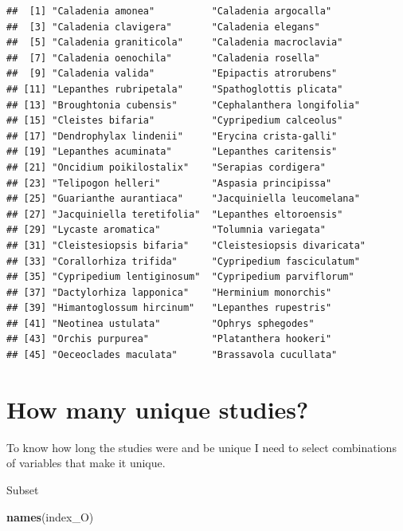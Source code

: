 \documentclass[
]{book}
\newenvironment{Shaded}{\begin{snugshade}}{\end{snugshade}}
\newcommand{\FunctionTok}[1]{\textcolor[rgb]{0.13,0.29,0.53}{\textbf{#1}}}
\newcommand{\NormalTok}[1]{#1}
\newcommand{\SpecialCharTok}[1]{\textcolor[rgb]{0.81,0.36,0.00}{\textbf{#1}}}
\theoremstyle{definition}
\theoremstyle{definition}
\theoremstyle{definition}
\theoremstyle{definition}
\theoremstyle{remark}
\begin{document}
\begin{Shaded}
\end{Shaded}

\begin{verbatim}
##  [1] "Caladenia amonea"          "Caladenia argocalla"      
##  [3] "Caladenia clavigera"       "Caladenia elegans"        
##  [5] "Caladenia graniticola"     "Caladenia macroclavia"    
##  [7] "Caladenia oenochila"       "Caladenia rosella"        
##  [9] "Caladenia valida"          "Epipactis atrorubens"     
## [11] "Lepanthes rubripetala"     "Spathoglottis plicata"    
## [13] "Broughtonia cubensis"      "Cephalanthera longifolia" 
## [15] "Cleistes bifaria"          "Cypripedium calceolus"    
## [17] "Dendrophylax lindenii"     "Erycina crista-galli"     
## [19] "Lepanthes acuminata"       "Lepanthes caritensis"     
## [21] "Oncidium poikilostalix"    "Serapias cordigera"       
## [23] "Telipogon helleri"         "Aspasia principissa"      
## [25] "Guarianthe aurantiaca"     "Jacquiniella leucomelana" 
## [27] "Jacquiniella teretifolia"  "Lepanthes eltoroensis"    
## [29] "Lycaste aromatica"         "Tolumnia variegata"       
## [31] "Cleistesiopsis bifaria"    "Cleistesiopsis divaricata"
## [33] "Corallorhiza trifida"      "Cypripedium fasciculatum" 
## [35] "Cypripedium lentiginosum"  "Cypripedium parviflorum"  
## [37] "Dactylorhiza lapponica"    "Herminium monorchis"      
## [39] "Himantoglossum hircinum"   "Lepanthes rupestris"      
## [41] "Neotinea ustulata"         "Ophrys sphegodes"         
## [43] "Orchis purpurea"           "Platanthera hookeri"      
## [45] "Oeceoclades maculata"      "Brassavola cucullata"
\end{verbatim}

\hypertarget{how-many-unique-studies-1}{%
\section{How many unique studies?}\label{how-many-unique-studies-1}}

To know how long the studies were and be unique I need to select combinations of variables that make it unique.

Subset

\begin{Shaded}
\begin{Highlighting}[]
\FunctionTok{names}\NormalTok{(index\_O)}
\end{Highlighting}
\end{Shaded}
\end{document}

